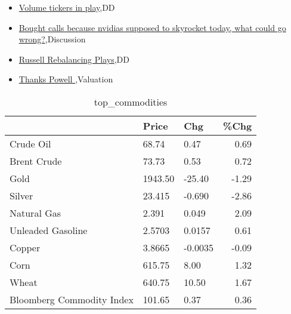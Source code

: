 \documentclass{article}%
\begin{document}
%
\begin{itemize}%
\item%
\href{https://reddit.com/r/wallstreetbets/comments/14a0g04/volume\_tickers\_in\_play/}{Volume tickers in play},DD%
\item%
\href{https://reddit.com/r/wallstreetbets/comments/14a0740/bought\_calls\_because\_nvidias\_supposed\_to/}{Bought calls because nvidias supposed to skyrocket today, what could go wrong?},Discussion%
\item%
\href{https://reddit.com/r/wallstreetbets/comments/149zl04/russell\_rebalancing\_plays/}{Russell Rebalancing Plays},DD%
\item%
\href{https://reddit.com/r/StockMarket/comments/149td0v/thanks\_powell/}{Thanks Powell },Valuation%
\end{itemize}%


\begin{table}[htbp]%
\caption{top\_commodities}%
\centering%
\begin{adjustbox}{width=1\textwidth}%
\begin{tabular}{lllr}
\toprule
                          &   Price &     Chg &  \%Chg \\
\midrule
               Crude Oil  &   68.74 &    0.47 &  0.69 \\
             Brent Crude  &   73.73 &    0.53 &  0.72 \\
                    Gold  & 1943.50 &  -25.40 & -1.29 \\
                  Silver  &  23.415 &  -0.690 & -2.86 \\
             Natural Gas  &   2.391 &   0.049 &  2.09 \\
       Unleaded Gasoline  &  2.5703 &  0.0157 &  0.61 \\
                  Copper  &  3.8665 & -0.0035 & -0.09 \\
                    Corn  &  615.75 &    8.00 &  1.32 \\
                   Wheat  &  640.75 &   10.50 &  1.67 \\
Bloomberg Commodity Index &  101.65 &    0.37 &  0.36 \\
\bottomrule
\end{tabular}
%
\end{adjustbox}%
\end{table}

%
\end{document}
